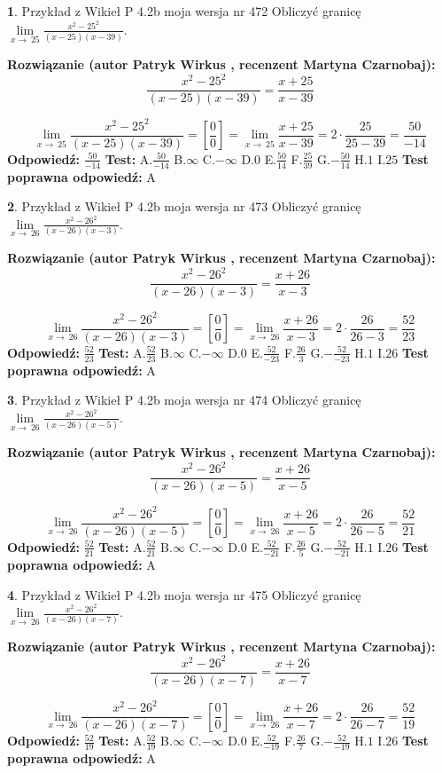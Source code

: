 \documentclass[12pt, a4paper]{article}
\theoremstyle{definition} %
\newtheorem{zad}{}
\newcommand{\zadStart}[1]{\begin{zad}#1\newline}
\newcommand{\zadStop}{\end{zad}}
\newcommand{\rozwStart}[2]{\noindent \textbf{Rozwiązanie (autor #1 , recenzent #2): }\newline}
\newcommand{\rozwStop}{\newline}
\newcommand{\odpStart}{\noindent \textbf{Odpowiedź:}\newline}
\newcommand{\odpStop}{\newline}
\newcommand{\testStart}{\noindent \textbf{Test:}\newline}
\newcommand{\testStop}{\newline}
\newcommand{\kluczStart}{\noindent \textbf{Test poprawna odpowiedź:}\newline}
\newcommand{\kluczStop}{\newline}
\begin{document}
\zadStart{Przykład z Wikieł P 4.2b moja wersja nr 472}
Obliczyć granicę $\lim\limits_{x\to\ 25}\frac{x^{2}-25^{2}}{(x-25)(x-39)}$.
\zadStop
\rozwStart{Patryk Wirkus}{Martyna Czarnobaj}
$$\frac{x^{2}-25^{2}}{(x-25)(x-39)}=\frac{x+25}{x-39}$$

$$\lim\limits_{x\to\ 25}\frac{x^{2}-25^{2}}{(x-25)(x-39)}=[\frac{0}{0}]=\lim\limits_{x\to\ 25}\frac{x+25}{x-39}=2 \cdot \frac{25}{25-39} = \frac{50}{-14}$$
\rozwStop
\odpStart
$\frac{50}{-14}$
\odpStop
\testStart
A.$\frac{50}{-14}$
B.$\infty$
C.$-\infty$
D.$0$
E.$\frac{50}{14}$
F.$\frac{25}{39}$
G.$-\frac{50}{14}$
H.$1$
I.$25$
\testStop
\kluczStart
A
\kluczStop



\zadStart{Przykład z Wikieł P 4.2b moja wersja nr 473}
Obliczyć granicę $\lim\limits_{x\to\ 26}\frac{x^{2}-26^{2}}{(x-26)(x-3)}$.
\zadStop
\rozwStart{Patryk Wirkus}{Martyna Czarnobaj}
$$\frac{x^{2}-26^{2}}{(x-26)(x-3)}=\frac{x+26}{x-3}$$

$$\lim\limits_{x\to\ 26}\frac{x^{2}-26^{2}}{(x-26)(x-3)}=[\frac{0}{0}]=\lim\limits_{x\to\ 26}\frac{x+26}{x-3}=2 \cdot \frac{26}{26-3} = \frac{52}{23}$$
\rozwStop
\odpStart
$\frac{52}{23}$
\odpStop
\testStart
A.$\frac{52}{23}$
B.$\infty$
C.$-\infty$
D.$0$
E.$\frac{52}{-23}$
F.$\frac{26}{3}$
G.$-\frac{52}{-23}$
H.$1$
I.$26$
\testStop
\kluczStart
A
\kluczStop



\zadStart{Przykład z Wikieł P 4.2b moja wersja nr 474}
Obliczyć granicę $\lim\limits_{x\to\ 26}\frac{x^{2}-26^{2}}{(x-26)(x-5)}$.
\zadStop
\rozwStart{Patryk Wirkus}{Martyna Czarnobaj}
$$\frac{x^{2}-26^{2}}{(x-26)(x-5)}=\frac{x+26}{x-5}$$

$$\lim\limits_{x\to\ 26}\frac{x^{2}-26^{2}}{(x-26)(x-5)}=[\frac{0}{0}]=\lim\limits_{x\to\ 26}\frac{x+26}{x-5}=2 \cdot \frac{26}{26-5} = \frac{52}{21}$$
\rozwStop
\odpStart
$\frac{52}{21}$
\odpStop
\testStart
A.$\frac{52}{21}$
B.$\infty$
C.$-\infty$
D.$0$
E.$\frac{52}{-21}$
F.$\frac{26}{5}$
G.$-\frac{52}{-21}$
H.$1$
I.$26$
\testStop
\kluczStart
A
\kluczStop



\zadStart{Przykład z Wikieł P 4.2b moja wersja nr 475}
Obliczyć granicę $\lim\limits_{x\to\ 26}\frac{x^{2}-26^{2}}{(x-26)(x-7)}$.
\zadStop
\rozwStart{Patryk Wirkus}{Martyna Czarnobaj}
$$\frac{x^{2}-26^{2}}{(x-26)(x-7)}=\frac{x+26}{x-7}$$

$$\lim\limits_{x\to\ 26}\frac{x^{2}-26^{2}}{(x-26)(x-7)}=[\frac{0}{0}]=\lim\limits_{x\to\ 26}\frac{x+26}{x-7}=2 \cdot \frac{26}{26-7} = \frac{52}{19}$$
\rozwStop
\odpStart
$\frac{52}{19}$
\odpStop
\testStart
A.$\frac{52}{19}$
B.$\infty$
C.$-\infty$
D.$0$
E.$\frac{52}{-19}$
F.$\frac{26}{7}$
G.$-\frac{52}{-19}$
H.$1$
I.$26$
\testStop
\kluczStart
A
\kluczStop
\end{document}
